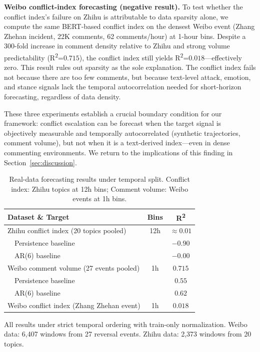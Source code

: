 \documentclass[journal]{IEEEtran}
\begin{document}
\textbf{Weibo conflict-index forecasting (negative result).} To test whether the conflict index's failure on Zhihu is attributable to data sparsity alone, we compute the same BERT-based conflict index on the densest Weibo event (Zhang Zhehan incident, 22K comments, 62 comments/hour) at 1-hour bins. Despite a 300-fold increase in comment density relative to Zhihu and strong volume predictability (R\textsuperscript{2}=$0.715$), the conflict index still yields R\textsuperscript{2}=$0.018$---effectively zero. This result rules out sparsity as the sole explanation. The conflict index fails not because there are too few comments, but because text-level attack, emotion, and stance signals lack the temporal autocorrelation needed for short-horizon forecasting, regardless of data density.

These three experiments establish a crucial boundary condition for our framework: conflict escalation can be forecast when the target signal is objectively measurable and temporally autocorrelated (synthetic trajectories, comment volume), but not when it is a text-derived index---even in dense commenting environments. We return to the implications of this finding in Section~\ref{sec:discussion}.

\begin{table}[H]
\caption{Real-data forecasting results under temporal split. Conflict index: Zhihu topics at 12h bins; Comment volume: Weibo events at 1h bins.}\label{tab:real_results}
\centering
\begin{threeparttable}

\begin{tabular}{lcc}
\toprule
\textbf{Dataset \& Target} & \textbf{Bins} & \textbf{R\textsuperscript{2}} \\
\midrule
Zhihu conflict index (20 topics pooled) & 12h & $\approx 0.01$ \\
\ \ Persistence baseline & & $-0.90$ \\
\ \ AR(6) baseline & & $-0.00$ \\
Weibo comment volume (27 events pooled) & 1h & $\mathbf{0.715}$ \\
\ \ Persistence baseline & & $0.55$ \\
\ \ AR(6) baseline & & $0.62$ \\
Weibo conflict index (Zhang Zhehan event) & 1h & $0.018$ \\
\bottomrule
\end{tabular}
\begin{tablenotes}
\item All results under strict temporal ordering with train-only normalization. Weibo data: 6,407 windows from 27 reversal events. Zhihu data: 2,373 windows from 20 topics.
\end{tablenotes}
\end{threeparttable}
\end{table}
\end{document}
